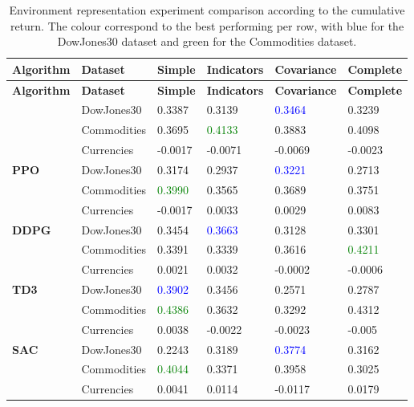 \begin{longtable}{|p{2cm}|p{2.2cm}|p{2cm}|p{2cm}|p{2.2cm}|p{2cm}|}
    \caption{Environment representation experiment comparison according to the cumulative return. The colour correspond to the best performing per row, with blue for the DowJones30 dataset and green for the Commodities dataset.}
    \label{tab:experiment_environment_cumulative}
    \\ 
    \hline
    \textbf{Algorithm} & \textbf{Dataset} & \textbf{Simple} & \textbf{Indicators} & \textbf{Covariance} & \textbf{Complete} \\ \midrule
    \endfirsthead

    \hline
    \textbf{Algorithm} & \textbf{Dataset} & \textbf{Simple} & \textbf{Indicators} & \textbf{Covariance} & \textbf{Complete}  \\ \midrule
    \endhead

    \endfoot

    \hline  
    \multirow{3}{*}{\textbf{A2C}}
    & DowJones30 & 0.3387 & 0.3139 & \textcolor{blue}{0.3464} & 0.3239 \\ \cline{2-6}
    & Commodities & 0.3695 & \textcolor{green}{0.4133} & 0.3883 & 0.4098 \\ \cline{2-6}
    & Currencies & -0.0017 & -0.0071 & -0.0069 & -0.0023 \\ \midrule

    \multirow{3}{*}{\textbf{PPO}}
    & DowJones30 & 0.3174 & 0.2937 & \textcolor{blue}{0.3221} & 0.2713 \\ \cline{2-6}
    & Commodities & \textcolor{green}{0.3990} & 0.3565 & 0.3689 & 0.3751 \\ \cline{2-6}
    & Currencies & -0.0017 & 0.0033 & 0.0029 & 0.0083 \\ \midrule

    \multirow{3}{*}{\textbf{DDPG}}
    & DowJones30 & 0.3454 & \textcolor{blue}{0.3663} & 0.3128 & 0.3301 \\ \cline{2-6}
    & Commodities & 0.3391 & 0.3339 & 0.3616 & \textcolor{green}{0.4211} \\ \cline{2-6}
    & Currencies & 0.0021 & 0.0032 & -0.0002 & -0.0006 \\ \midrule

    \multirow{3}{*}{\textbf{TD3}}
    & DowJones30 & \textcolor{blue}{0.3902} & 0.3456 & 0.2571 & 0.2787 \\ \cline{2-6}
    & Commodities & \textcolor{green}{0.4386} & 0.3632 & 0.3292 & 0.4312 \\ \cline{2-6}
    & Currencies & 0.0038 & -0.0022 & -0.0023 & -0.005 \\ \midrule

    \multirow{3}{*}{\textbf{SAC}}
    & DowJones30 & 0.2243 & 0.3189 & \textcolor{blue}{0.3774} & 0.3162 \\ \cline{2-6}
    & Commodities & \textcolor{green}{0.4044} & 0.3371 & 0.3958 & 0.3025 \\ \cline{2-6}
    & Currencies & 0.0041 & 0.0114 & -0.0117 & 0.0179 \\ \midrule
\end{longtable}